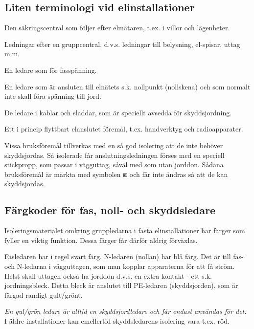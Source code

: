 \subsection{Liten terminologi vid elinstallationer}
\begin{description}[style=nextline]
\item[Gruppcentral] Den säkringscentral som följer efter elmätaren,
  t.ex. i villor och lägenheter.
\item [Gruppledningar] Ledningar efter en gruppcentral, d.v.s.
  ledningar till belysning, el-spisar, uttag m.m.
\item[Fasledare] En ledare som för fasspänning.
\item[Nolledare (N-ledare)] En ledare som är ansluten till elnätets
  s.k.  nollpunkt (nollskena) och som normalt inte skall föra spänning
  till jord.
\item[Skyddsledare (PE-Iedare)] De ledare i kablar och sladdar, som är
  speciellt avsedda för skyddsjordning.
\item[Bruksföremål] Ett i princip flyttbart elanslutet föremål,
  t.ex. handverktyg och radioapparater.
\item[Förstärkt isolering] Vissa bruksföremål tillverkas med en så god
  isolering att de inte behöver skyddsjordas. Så isolerade får
  anslutningsledningen förses med en speciell stickpropp, som passar i
  vägguttag, såväl med som utan jorddon. Sådana bruksföremål är märkta
  med symbolen \(\boxbox\) och får inte ändras så att de kan skyddsjordas.
\end{description}

\subsection{Färgkoder för fas, noll- och skyddsledare}

Isoleringsmaterialet omkring gruppledarna i fasta elinstallationer har
färger som fyller en viktig funktion. Dessa färger får därför aldrig
förväxlas.

Fasledaren har i regel svart färg. N-ledaren (nollan) har blå färg.
Det är till fas- och N-ledarna i vägguttagen, som man kopplar
apparaterna för att få ström. Helst skall uttagen också ha jorddon
d.v.s. en extra kontakt - ett s.k. jordningsbleck. Detta bleck är
anslutet till PE-ledaren (skyddsjorden), som är färgad randigt
gult/grönt.

\emph{En gul/grön ledare är alltid en skyddsjordledare och får endast
  användas för det.} I äldre installationer kan emellertid
skyddsledarens isolering vara t.ex. röd.



